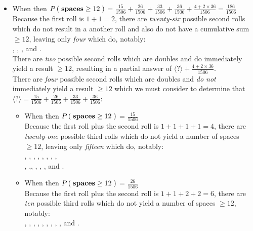 \documentclass{ProblemSetCUNY}
\newcommand{\Prob}[1]{\ensuremath{P\Parens{#1}}\xspace}
\begin{document}
\begin{itemize}
\item When  then \Prob{\textbf{spaces} \ge 12} = $\frac{15}{1506} + \frac{26}{1506} + \frac{33}{1506} + \frac{36}{1506} + \frac{4 + 2 \times 36}{1506} = \frac{186}{1506}$\\
Because the first roll is $1 + 1 = 2$, there are \emph{twenty-six} possible second rolls which do not result in a another roll and also do not have a cumulative sum $\ge 12$, leaving only \emph{four} which do, notably:\\
, , , and .\\
There are \emph{two} possible second rolls which are doubles and do immediately yield a result $\ge 12$, resulting in a partial answer of $\langle?\rangle + \frac{4 + 2 \times 36}{1506} $.\\
There are \emph{four} possible second rolls which are doubles and \emph{do not} immediately yield a result $\ge 12$ which we must consider to determine that $\langle?\rangle =  \frac{15}{1506} + \frac{26}{1506} + \frac{33}{1506} + \frac{36}{1506}$:
\begin{itemize}
\item When  then \Prob{\textbf{spaces} \ge 12} = $\frac{15}{1506}$\\
Because the first roll plus the second roll is $1 + 1 + 1 + 1 = 4$, there are \emph{twenty-one} possible third rolls which do not yield a number of spaces $\ge 12$, leaving only \emph{fifteen} which do, notably:\\
, , , ,  , , , ,\\ , ,, , , , and  .
\item When  then \Prob{\textbf{spaces} \ge 12} = $\frac{26}{1506}$\\
Because the first roll plus the second roll is $1 + 1 + 2 + 2 = 6$, there are \emph{ten} possible third rolls which do not yield a number of spaces $\ge 12$, notably:\\
, , , ,  , , , , , and .

\end{itemize}
\end{itemize}
\end{document}
